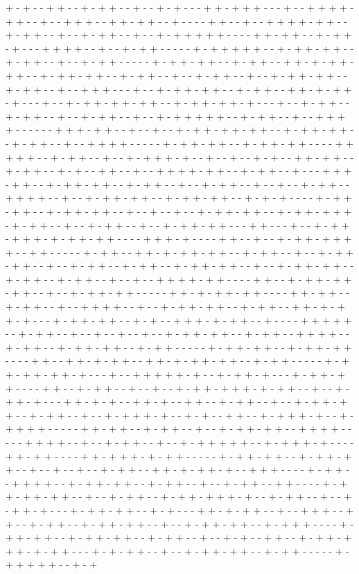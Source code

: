 + - + - - + + - - + - + + - - + - - + - + - - - + + - + + + - - - + - - + + + + - + + - - + - - + + + - - + + - + + - - + - - - - + + - - + - - + + + + - + + - - + - + + - - + - - + - + + - - + - - + - + + + + + - - - - + + - + + - - + - + + - + - - - + + + + - - + - - + - + + - - - - - + - + + + + + - - + - + + - + + - - + - + + - - + - - + - + + - - - - - + - + + - + + - - + - + + - - + + - + - + + - + + - - + - + + - + + - - + - + + - - + - - + - + + - - + - - + - + + - + + - - + - + + - - + - - + + + - - - + - - + - + + - + + - - + - + + - - + + - + - + + - + - - - + - - + - + + - + + - + + - - + - + + - + + - + - - - + - - + - + + - - + - + + - - + - - + - + + - - + - - + - + + + + + - - + - + + - - + - - + + + + - - - - - - + + + - + + - - + - - + - - + - + + - + + - + + - - + - + + - + + - - + - + + - - + - - + + + + - - - - - + - + + - + + - - + - + + - + + - - - - + + + + + - - + - + + - - + - - + - + + + - + - - + - - + - - + - + - - + + - + + - - + - + + - - + - + - - + + - - + - - + + + + - + + - - + - + + - - + - - - + + + - + + - - + - + + - + + - - + - + + - - + - - + - + + - - + - - + - - + - + + - - + + + + - - + - - + - + + - + + - - + - + + - + + - - + - + - + - - - - + - + + - + + - - + - + + - + + - - + - - + - - + - - + - + + - + + - - + - + + - + + + - + - + + - - + - - + - + + - - + - - + - + + - + + - - - + + - - - + - - + - + + - + + + - + - + + - + + - - - - + + + - + - - - - + + - - + - - + - + + - + + + + - - + + - - - - - + - + + - - + + - + - + + - + + - - + - + + - - + - - + - + + - + + - - + - - + - + + - - + - + + - - + - + + - + + - - + - - + - + + - + + - - + - + + - - + - + + - - + - - + - - + + + + - + + - - - - + + - - + - + + - + + - + + - - + - - + - + + - + + - - - - - + + - + - + + - + + - - - - + + - + + - - + - + + - - + - - + + + + - - + - - + - + + - + + - - + - + + - - + + - + - + + - + - - - + - + + - + + - - + - + - - + + + - + - + + - - + - - - - + + + + + - - + - + + - - + - - + - - + - - + - - + - + + - + + - - + - + + - - + + + + - - + - + + - - + - + + - + + - - + - + + - - - - - + - + + - + + - - + - + + - + + - - - - + + - - + + - + - + + - - + + - + - + + - + + - - + - + + - - - - - + - + + - + + - + + - + - - - + - - + + + + + - + - - + - + + - + - - - + - + + - + + - - - - + + - - + - + + - - + - - + - - + - + + - + + + - + - + + - - + - - + - + + - + - - - + + - + - + - - + + - + - - + + - - + - + + - - + - - + - + + - + + - - + - + + - - + - - + - + + + - + - - + - + - - + + - - + - + + + - + - - + - + + + + - - - - - + + - + + - - + - + + - - + - - + - + + - + + - - + + + + - - - - - + + + + - - + - - + - + + - - + - - + - + + + + + - - + - + + + - + - - - - + + - + + - - - - + + - + + + - + - + + - - - - - + - + + - + + - - + - + + - + + - - + - - + - - + - - + - + + - - + + - + - + + - + - - + + + - - - - + - + + - - + + + + - - + - + + - + + - - + - + + - - + - - + - + + - - + + - - - - + - + + - + + - + + - - + - - + - + + - - + - + + - + + + - + - - + - + + - - + - - + - + + - + - - - + - + + - + + - - + - + - - - + + - + - + + - - + - - + + + - - + + - - + - + + - - + - + + - + + - - + - - + - + + - + + - - + - + + + - - - - + - + + - + + - - + - + + - + + - - + - + + - - + - - + - + - - + + - - + - + + - + + + - + - + + - - - + - + - + + - - + - - + - + + - + + - - + - + + - - - - - + - + + + + + - - + - + 